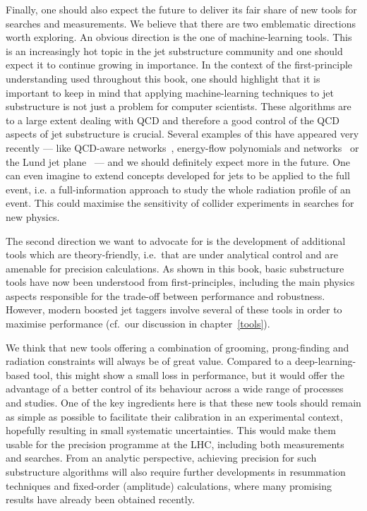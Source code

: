 Finally, one should also expect the future to deliver its fair share
of new tools for searches and measurements.
%
We believe that there are two emblematic directions worth exploring.
%
An obvious direction is the one of machine-learning tools. This is an
increasingly hot topic in the jet substructure community and one
should expect it to continue growing in importance.
%
In the context of the first-principle understanding used throughout
this book, one should highlight that it is important to keep in mind
that applying machine-learning techniques to jet substructure is not
just a problem for computer scientists. These algorithms are to a large
extent dealing with QCD and therefore a good control of the QCD
aspects of jet substructure is crucial. Several examples of this have
appeared very recently --- like QCD-aware
networks~\cite{Louppe:2017ipp}, energy-flow polynomials and
networks~\cite{Komiske:2017aww,Komiske:2018cqr} or the Lund jet
plane~\cite{Dreyer:2018nbf} --- and we should definitely expect more
in the future.
%
One can even imagine to extend concepts developed for jets to be
applied to the full event, i.e. a full-information approach to study
the whole radiation profile of an event. This could maximise the
sensitivity of collider experiments in searches for new physics.

The second direction we want to advocate for is the development of
additional tools which are theory-friendly, i.e.\ that are under
analytical control and are amenable for precision calculations.
%
As shown in this book, basic substructure tools have now been
understood from first-principles, including the main physics aspects
responsible for the trade-off between performance and
robustness. However, modern boosted jet taggers involve several of
these tools in order to maximise performance (cf.\ our discussion in
chapter~\ref{tools}). 

We think that new tools offering a combination of grooming,
prong-finding and radiation constraints will always be of great value.
%
Compared to a deep-learning-based tool, this
might show a small loss in performance, but it would offer the
advantage of a better control of its behaviour across a wide range of
processes and studies. One of the key ingredients here is that these
new tools should remain as simple as possible to facilitate their
calibration in an experimental context, hopefully resulting in small
systematic uncertainties. This would make them usable for the
precision programme at the LHC, including both measurements and
searches.
%
From an analytic perspective, achieving precision for such
substructure algorithms will also require further developments in
resummation techniques and fixed-order (amplitude) calculations, where
many promising results have already been obtained recently. 

